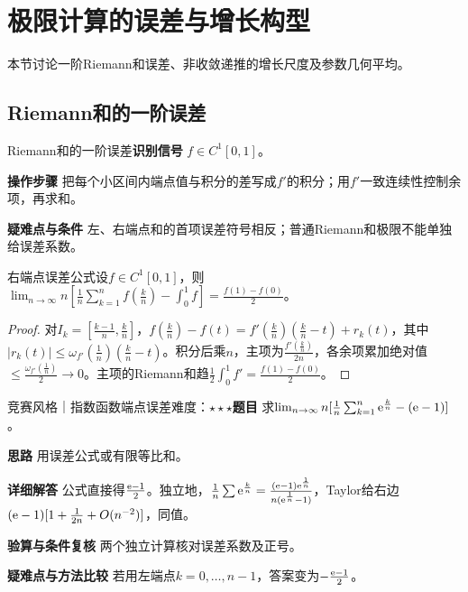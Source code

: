 \section{极限计算的误差与增长构型}\label{ic:delta_limits}

\begin{examtip}本节讨论一阶Riemann和误差、非收敛递推的增长尺度及参数几何平均。\end{examtip}

\subsection{Riemann和的一阶误差}\label{ic:delta_limits:riemannerror}\begin{method}{Riemann和的一阶误差}\textbf{识别信号} $f\in C^1[0,1]$。\par \textbf{操作步骤} 把每个小区间内端点值与积分的差写成$f'$的积分；用$f'$一致连续性控制余项，再求和。\par \textbf{疑难点与条件} 左、右端点和的首项误差符号相反；普通Riemann和极限不能单独给误差系数。\end{method}

\begin{theorem}{右端点误差公式}设$f\in C^1[0,1]$，则$\lim_{n\to\infty}n[\frac1n\sum_{k=1}^nf(\frac{k}{n})-\int_0^1f]=\frac{f(1)-f(0)}{2}$。\end{theorem}\begin{proof}对$I_k=[\frac{k-1}{n},\frac{k}{n}]$，$f(\frac{k}{n})-f(t)=f'(\frac{k}{n})(\frac{k}{n}-t)+r_k(t)$，其中$|r_k(t)|\le\omega_{f'}(\frac{1}{n})(\frac{k}{n}-t)$。积分后乘$n$，主项为$\frac{f'(\frac{k}{n})}{2n}$，各余项累加绝对值$\le\frac{\omega_{f'}(\frac{1}{n})}{2}\to0$。主项的Riemann和趋$\frac12\int_0^1f'=\frac{f(1)-f(0)}{2}$。\end{proof}

\begin{example}{竞赛风格｜指数函数端点误差}{难度：$\star\star\star$}\label{ic:ex:delta_limits:riemannerrorcase}\textbf{题目} 求$\lim_{n\to\infty}n[\frac1n\sum_{k=1}^n\mathrm{e}^{\frac{k}{n}}-(\mathrm{e}-1)]$。\par \textbf{思路} 用误差公式或有限等比和。\par \textbf{详细解答} 公式直接得$\frac{\mathrm{e}-1}{2}$。独立地，$\frac1n\sum\mathrm{e}^{\frac{k}{n}}=\frac{(\mathrm{e}-1)\mathrm{e}^{\frac{1}{n}}}{n(\mathrm{e}^{\frac{1}{n}}-1)}$，Taylor给右边$(\mathrm{e}-1)[1+\frac{1}{2n}+O(n^{-2})]$，同值。\par \textbf{验算与条件复核} 两个独立计算核对误差系数及正号。\par \textbf{疑难点与方法比较} 若用左端点$k=0,\ldots,n-1$，答案变为$-\frac{\mathrm{e}-1}{2}$。\end{example}

